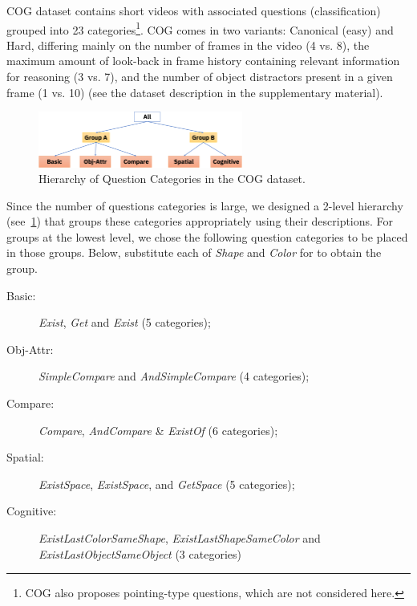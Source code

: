 COG dataset contains short videos with associated questions (classification)
grouped into 23 categories\footnote{COG also proposes pointing-type questions, which are not considered here.}.
COG comes in two variants: Canonical (easy) and Hard, differing mainly on the number of frames in the video (4 vs. 8), the maximum amount of look-back in frame history containing relevant information for reasoning (3 vs. 7), and the number of object distractors present in a given frame (1 vs. 10) (see the dataset description in the supplementary material).

\begin{figure}[!t]
	\centering
	\includegraphics[width=0.6\textwidth]{../img/architecture/hierarchy}
	\caption{Hierarchy of Question Categories in the COG dataset.}
	\label{fig:question-groups}
\end{figure}

Since the number of questions categories is large, we designed a 2-level hierarchy  (see~\cref{fig:question-groups})
that groups these categories appropriately using their descriptions. 
For groups at the lowest level, we chose the following question categories to be placed in those groups.
Below, substitute each of \textit{Shape} and \textit{Color} for  \uX{} to obtain the group.
\begin{description}
	\item[Basic:] \textit{Exist}\uX, \textit{Get}\uX{} and \textit{Exist} (5 categories);
	\item[Obj-Attr:] \emph{SimpleCompare}\uX{} and \textit{AndSimpleCompare}\uX{} (4 categories);
	\item[Compare:] \textit{Compare}\uX,  \textit{AndCompare}\uX{} \& \textit{Exist}\uX\textit{Of} (6 categories);
	\item[Spatial:] \textit{ExistSpace}, \textit{Exist}\uX\textit{Space}, and \textit{Get}\uX\textit{Space} (5 categories);
	\item[Cognitive:] \textit{ExistLastColorSameShape}, \textit{ExistLastShapeSameColor} and \textit{ExistLastObjectSameObject} (3 categories)
\end{description}









